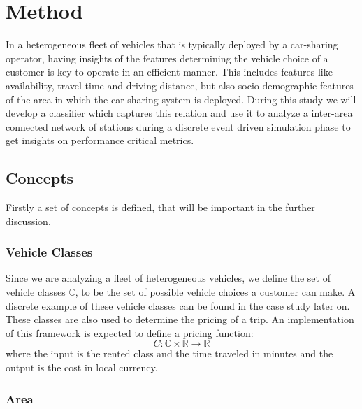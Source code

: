 \clearpage
\section{Method}
\label{sec:Method}

In a heterogeneous fleet of vehicles that is typically deployed by a car-sharing operator,
having insights of the features determining the vehicle choice of a customer is key
to operate in an efficient manner. This includes features like availability, travel-time
and driving distance, but also socio-demographic features of the area in which the
car-sharing system is deployed. During this study we will develop a classifier which 
captures this relation and use it to analyze a inter-area connected network of stations
during a discrete event driven simulation phase to get insights on performance critical
metrics.

\subsection{Concepts}
\label{sub_sec:Method/Concepts}

Firstly a set of concepts is defined, that will be important in the further discussion.

\subsubsection{Vehicle Classes}
\label{sub_sec:Method/Concepts/Classes}

Since we are analyzing a fleet of heterogeneous vehicles, we define the set of vehicle
classes $\mathbb{C}$, to be the set of possible vehicle choices a customer can make. A
discrete example of these vehicle classes can be found in the case study later on. These
classes are also used to determine the pricing of a trip. An implementation of this
framework is expected to define a pricing function:
$$
C: \mathbb{C} \times  \mathbb{R} \to \mathbb{R}
$$
where the input is the rented class and the time traveled in minutes and the output is the
cost in local currency.

\subsubsection{Area}
\label{sub_sec:Method/Concepts/Area}

